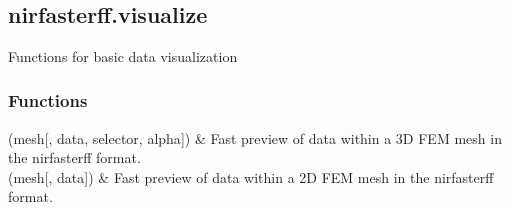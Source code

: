\documentclass[letterpaper,10pt,english]{sphinxmanual}
\begin{document}
\begin{fulllineitems}
\begin{savenotes}
\begin{tabulary}{\linewidth}[t]{}
\\
\sphinxbottomrule
\end{tabulary}
\sphinxtableafterendhook\par
\sphinxattableend\end{savenotes}

\end{fulllineitems}


\sphinxstepscope


\subsection{nirfasterff.visualize}
\label{\detokenize{_autosummary/nirfasterff.visualize:module-nirfasterff.visualize}}\label{\detokenize{_autosummary/nirfasterff.visualize:nirfasterff-visualize}}\label{\detokenize{_autosummary/nirfasterff.visualize::doc}}
\sphinxAtStartPar
Functions for basic data visualization
\subsubsection*{Functions}


\begin{savenotes}\sphinxattablestart
\sphinxthistablewithglobalstyle
\sphinxthistablewithnovlinesstyle
\centering
\begin{tabulary}{\linewidth}[t]{}
\sphinxtoprule
\sphinxtableatstartofbodyhook
\sphinxAtStartPar
{\hyperref[\detokenize{_autosummary/nirfasterff.visualize.plot3dmesh:nirfasterff.visualize.plot3dmesh}]{}}(mesh{[}, data, selector, alpha{]})
&
\sphinxAtStartPar
Fast preview of data within a 3D FEM mesh in the nirfasterff format.
\\
\sphinxhline
\sphinxAtStartPar
{\hyperref[\detokenize{_autosummary/nirfasterff.visualize.plotimage:nirfasterff.visualize.plotimage}]{}}(mesh{[}, data{]})
&
\sphinxAtStartPar
Fast preview of data within a 2D FEM mesh in the nirfasterff format.
\\
\sphinxbottomrule
\end{tabulary}
\sphinxtableafterendhook\par
\sphinxattableend\end{savenotes}

\sphinxstepscope
\end{document}
